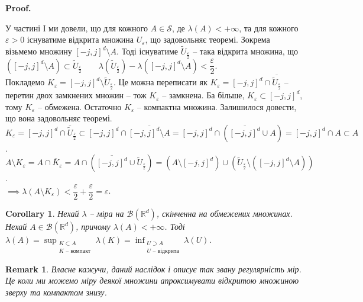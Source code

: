 \documentclass[a4paper, 10pt]{article}
\makeatletter
\theoremstyle{theoremdd}
\newtheorem{remark}[theorem]{Remark}
\newtheorem{corollary}[theorem]{Corollary}
\renewenvironment{proof}[1][Proof.\\]{\par
\pushQED{\hfill \qed}%
\normalfont \topsep6\p@\@plus6\p@\relax
\trivlist
\item\relax
{\bfseries
#1\@addpunct{.}}\hspace\labelsep\ignorespaces
}{%
\popQED\endtrivlist\@endpefalse
}
\makeatother
\begin{document}
\begin{proof}
У частині І ми довели, що для кожного $A \in \mathcal{S}$, де $\lambda(A) < +\infty$, та для кожного $\varepsilon > 0$ існуватиме відкрита множина $U_\varepsilon$, що задовольняє теоремі. Зокрема візьмемо множину $[-j,j]^d \setminus A$. Тоді існуватиме $\tilde{U}_{\frac{\varepsilon}{2}}$ -- така відкрита множина, що\\
$([-j,j]^d \setminus A) \subset \tilde{U}_{\frac{\varepsilon}{2}} \qquad \lambda\left( \tilde{U}_{\frac{\varepsilon}{2}} \right) - \lambda([-j,j]^d \setminus A) < \dfrac{\varepsilon}{2}$.\\
Покладемо $K_\varepsilon = [-j,j]^d \setminus \tilde{U}_{\frac{\varepsilon}{2}}$. Це можна переписати як $K_\varepsilon = [-j,j]^d \cap \overline{\tilde{U}_{\frac{\varepsilon}{2}}}$ -- перетин двох замкнених множин -- тож $K_\varepsilon$ -- замкнена. Ба більше, $K_\varepsilon \subset [-j,j]^d$, тому $K_\varepsilon$ -- обмежена. Остаточно $K_\varepsilon$ -- компактна множина. Залишилося довести, що вона задовольняє теоремі.\\
$K_\varepsilon = [-j,j]^d \cap \overline{\tilde{U}}_{\frac{\varepsilon}{2}} \subset [-j,j]^d \cap \overline{[-j,j]^d \setminus A} = [-j,j]^d \cap (\overline{[-j,j]^d} \cup A) = [-j,j]^d \cap A \subset A$.\\
$A \setminus K_\varepsilon = A \cap \overline{K}_\varepsilon = A \cap \left( \overline{[-j,j]^d} \cup \tilde{U}_{\frac{\varepsilon}{2}} \right) = (A \setminus [-j,j]^d) \cup \left( \tilde{U}_{\frac{\varepsilon}{2}} \setminus ( [-j,j]^d \setminus A ) \right)$.\\
$\implies \lambda(A \setminus K_\varepsilon) < \dfrac{\varepsilon}{2} + \dfrac{\varepsilon}{2} = \varepsilon$.
\end{proof}

\begin{corollary}
Нехай $\lambda$ -- міра на $\mathcal{B}(\mathbb{R}^d)$, скінченна на обмежених множинах. Нехай $A \in \mathcal{B}(\mathbb{R}^d)$, причому $\lambda(A) < +\infty$. Тоді $\lambda(A) = \displaystyle\sup_{\substack{K \subset A \\ K \text{ -- компакт}}} \lambda(K) = \inf_{\substack{U \supset A \\ U \text{ -- відкрита}}} \lambda(U)$.
\end{corollary}

\begin{remark}
Власне кажучи, даний наслідок і описує так звану регулярність мір. Це коли ми можемо міру деякої множини апроксимувати відкритою множиною зверху та компактом знизу.
\end{remark}
\end{document}
